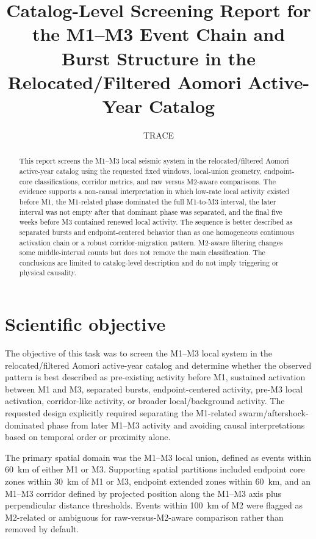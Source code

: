 \documentclass[11pt]{article}
\title{Catalog-Level Screening Report for the M1--M3 Event Chain and Burst Structure in the Relocated/Filtered Aomori Active-Year Catalog}
\author{TRACE}
\date{}
\begin{document}
\maketitle

\begin{abstract}
This report screens the M1--M3 local seismic system in the relocated/filtered Aomori active-year catalog using the requested fixed windows, local-union geometry, endpoint-core classifications, corridor metrics, and raw versus M2-aware comparisons. The evidence supports a non-causal interpretation in which low-rate local activity existed before M1, the M1-related phase dominated the full M1-to-M3 interval, the later interval was not empty after that dominant phase was separated, and the final five weeks before M3 contained renewed local activity. The sequence is better described as separated bursts and endpoint-centered behavior than as one homogeneous continuous activation chain or a robust corridor-migration pattern. M2-aware filtering changes some middle-interval counts but does not remove the main classification. The conclusions are limited to catalog-level description and do not imply triggering or physical causality.
\end{abstract}

\section{Scientific objective}
The objective of this task was to screen the M1--M3 local system in the relocated/filtered Aomori active-year catalog and determine whether the observed pattern is best described as pre-existing activity before M1, sustained activation between M1 and M3, separated bursts, endpoint-centered activity, pre-M3 local activation, corridor-like activity, or broader local/background activity. The requested design explicitly required separating the M1-related swarm/aftershock-dominated phase from later M1--M3 activity and avoiding causal interpretations based on temporal order or proximity alone.

The primary spatial domain was the M1--M3 local union, defined as events within \SI{60}{km} of either M1 or M3. Supporting spatial partitions included endpoint core zones within \SI{30}{km} of M1 or M3, endpoint extended zones within \SI{60}{km}, and an M1--M3 corridor defined by projected position along the M1--M3 axis plus perpendicular distance thresholds. Events within \SI{100}{km} of M2 were flagged as M2-related or ambiguous for raw-versus-M2-aware comparison rather than removed by default.
\end{document}
